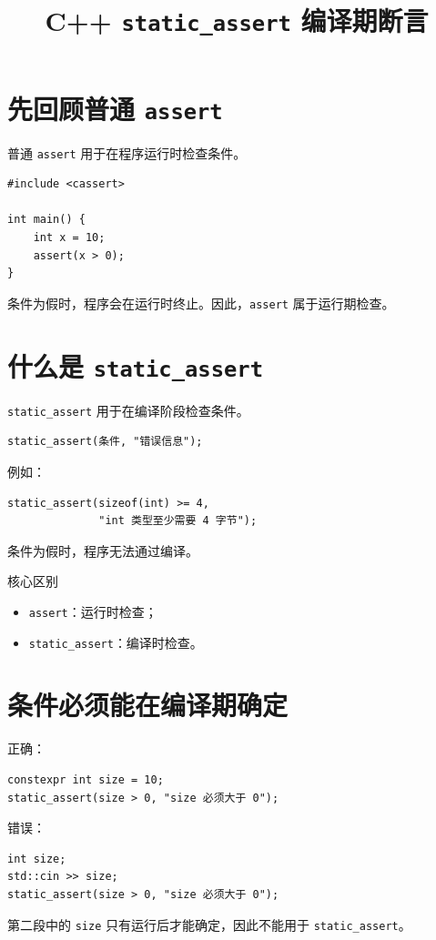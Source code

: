 \documentclass[UTF8,12pt,a4paper]{ctexart}
\title{\textbf{C++ \texttt{static\_assert} 编译期断言}}
\author{}
\date{}
\begin{document}
\maketitle

\section{先回顾普通 \texttt{assert}}
普通 \texttt{assert} 用于在程序运行时检查条件。
\begin{lstlisting}
#include <cassert>

int main() {
    int x = 10;
    assert(x > 0);
}
\end{lstlisting}
条件为假时，程序会在运行时终止。因此，\texttt{assert} 属于运行期检查。

\section{什么是 \texttt{static\_assert}}
\texttt{static\_assert} 用于在编译阶段检查条件。
\begin{lstlisting}
static_assert(条件, "错误信息");
\end{lstlisting}
例如：
\begin{lstlisting}
static_assert(sizeof(int) >= 4,
              "int 类型至少需要 4 字节");
\end{lstlisting}
条件为假时，程序无法通过编译。

\begin{conceptbox}{核心区别}
\begin{itemize}
    \item \texttt{assert}：运行时检查；
    \item \texttt{static\_assert}：编译时检查。
\end{itemize}
\end{conceptbox}

\section{条件必须能在编译期确定}
正确：
\begin{lstlisting}
constexpr int size = 10;
static_assert(size > 0, "size 必须大于 0");
\end{lstlisting}
错误：
\begin{lstlisting}
int size;
std::cin >> size;
static_assert(size > 0, "size 必须大于 0");
\end{lstlisting}
第二段中的 \texttt{size} 只有运行后才能确定，因此不能用于 \texttt{static\_assert}。
\end{document}
